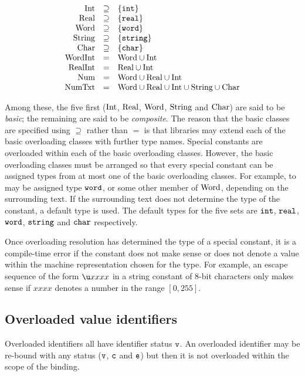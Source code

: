 \begin{displaymath}
  \begin{array}{rcl}
    \Int &\supseteq& \{\INT\}\\
    \Real &\supseteq& \{\REAL\}\\
    \Word &\supseteq& \{\WORD\}\\
    \String &\supseteq& \{\STRING\}\\
    \Char &\supseteq& \{\CHAR\}\\
    \WordInt &=& \Word\cup\INt\\
    \RealInt &=& \Real\cup\INt\\
    \Num &=& \Word\cup\Real\cup\INt\\
    \NumTxt &=& \Word\cup\Real\cup\INt\cup\String\cup\Char\\
  \end{array}%
\end{displaymath}%

\noindent 
Among these, the five first (${\rm Int}$, $\mbox{\rm Real}$, $\mbox{\rm Word}$, $\mbox{\rm String}$ and $\mbox{\rm Char}$) are said to be
{\sl basic}; the remaining are said to be {\sl composite}.
The reason that the basic classes are specified using
$\supseteq$ rather than $=$ is that libraries may extend 
each of the  basic overloading
classes with further type names.
Special constants are overloaded
within each of the basic overloading classes.  However, the basic
overloading classes must be arranged so that every special constant can be
assigned types from at most one of the basic overloading classes.  For
example, to  may be assigned type $\mbox{\tt word}$, or
some other member of $\mbox{\rm Word}$, depending on the surrounding text.  If
the surrounding text does not determine the type of the constant, a
default type is used. The default types for the five sets are $\mbox{\tt int}$,
$\mbox{\tt real}$, $\mbox{\tt word}$, $\mbox{\tt string}$ and $\mbox{\tt char}$ respectively.

       Once overloading resolution has determined the type of a special constant,
       it is a compile-time error if the constant does not make sense or does not 
       denote a value within the machine representation chosen for the type.
       For example, an escape sequence of the form $\uconst$ in a string constant
       of 8-bit characters only makes sense if $xxxx$  denotes
       a number in the range $[0, 255]$. 


\subsection{Overloaded value identifiers}
Overloaded identifiers all have identifier status $\hbox{\tt v}$. An
overloaded identifier may be re-bound with any status ($\hbox{\tt v}$, $\hbox{\tt c}$
and $\hbox{\tt e}$) but then it is not overloaded within the scope of
the binding.

